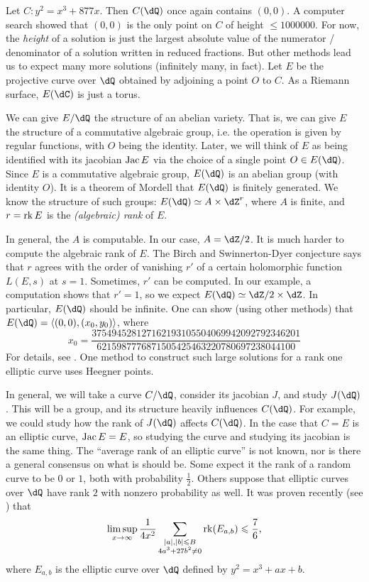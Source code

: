\documentclass{article}
\begin{document}
\begin{example}
Let $C:y^2=x^3+877 x$. Then $C(\dQ)$ once again contains $(0,0)$. A 
computer search showed that $(0,0)$ is the only point on $C$ of height 
$\leqslant 1000000$. For now, the \emph{height} of a solution is just the 
largest absolute value of the numerator / denominator of a solution written 
in reduced fractions. But other methods lead us to expect many more solutions
(infinitely many, in fact). Let $E$ be the projective curve over $\dQ$ obtained 
by adjoining a point $O$ to $C$. As a Riemann surface, $E(\dC)$ is just a 
torus. 

We can give $E/\dQ$ the 
structure of an abelian variety. That is, we can give $E$ the structure of a 
commutative algebraic group, i.e. the operation is given by regular  
functions, with $O$ being the identity. Later, we will think of $E$ as 
being identified with its jacobian $\operatorname{Jac} E$ via the choice of a single point 
$O\in E(\dQ)$. Since $E$ is a commutative algebraic group, $E(\dQ)$ is an 
abelian group (with identity $O$). It is a theorem of Mordell that $E(\dQ)$ is 
finitely generated. We know the structure of such groups: 
$E(\dQ)\simeq A\times \dZ^r$, where $A$ is finite, and $r=\operatorname{rk} E$ 
is the \emph{(algebraic) rank} of $E$. 

In general, the $A$ is computable. In our case, $A=\dZ/2$. It is much harder to 
compute the algebraic rank of $E$. The Birch and Swinnerton-Dyer 
conjecture says that $r$ agrees with the order of vanishing $r'$ of a certain 
holomorphic function $L(E,s)$ at $s=1$. Sometimes, $r'$ can be computed.  
In our example, a computation shows that $r'=1$, so we expect 
$E(\dQ)\simeq \dZ/2\times\dZ$. In particular, 
$E(\dQ)$ should be infinite. One can show (using other methods) that 
$E(\dQ)=\langle (0,0),(x_0,y_0)\rangle$, where 
\[
  x_0 = \frac{37 5494 5281 2716 2193 1055 0406 9942 0927 9234 6201}{6215 9877 7687 1505 4254 6322 0780 6972 3804 4100}
\]
For details, see \cite{br84}. One method to construct such large solutions for 
a rank one elliptic curve uses Heegner points. 
\end{example}

In general, we will take a curve $C/\dQ$, consider its jacobian $J$, and study 
$J(\dQ)$. This will be a group, and its structure heavily influences $C(\dQ)$. 
For example, we could study how the rank of $J(\dQ)$ affects $C(\dQ)$. In the 
case that $C=E$ is an elliptic curve, $\operatorname{Jac} E=E$, so studying the curve and 
studying its jacobian is the same thing. The ``average rank of an elliptic 
curve'' is not known, nor is there a general consensus on what is should be. 
Some expect it the rank of a random curve to be $0$ or $1$, both with 
probability $\frac 1 2$. Others suppose that elliptic curves over $\dQ$ have 
rank $2$ with nonzero probability as well. It was proven recently (see 
\cite[\S 1]{bh10}) that 
\[
  \limsup_{x\to\infty} \frac{1}{4 x^2} \sum_{\substack{|a|,|b|\leqslant B \\ 4 a^3+27 b^2\ne 0}} \operatorname{rk}(E_{a,b}) \leqslant\frac 7 6 \text{,}
\]
where $E_{a,b}$ is the elliptic curve over $\dQ$ defined by $y^2=x^3 +a x+b$.
\end{document}
